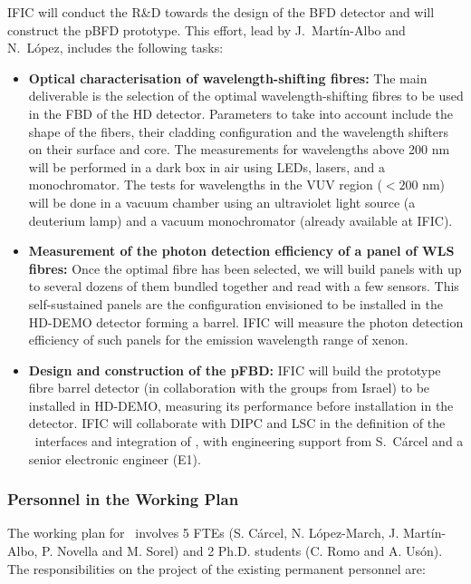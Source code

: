 IFIC will conduct the R\&D towards the design of the BFD detector and will construct the pBFD prototype. This effort, lead by J.~Mart\'in-Albo and N.~L\'opez, includes the following  tasks:
\begin{itemize}
    \item \textbf{Optical characterisation of wavelength-shifting fibres:} The main deliverable is the selection of the optimal wavelength-shifting fibres to be used in the FBD of the HD detector. Parameters to take into account include the shape of the fibers, their cladding configuration and the wavelength shifters on their surface and core. The measurements for wavelengths above 200 nm will be performed in a dark box in air using LEDs, lasers, and  a monochromator. The tests for wavelengths in the VUV region ($<200$ nm) will be done in a vacuum chamber using an ultraviolet light source (a deuterium lamp) and a vacuum monochromator (already available at IFIC).
    \item \textbf{Measurement of the photon detection efficiency of a panel of WLS fibres:} Once the optimal fibre has been selected, we will build panels with up to several dozens of them bundled together and read with a few sensors. This self-sustained panels are the configuration envisioned to be installed in the HD-DEMO detector forming a barrel. IFIC will measure the photon detection efficiency of such panels for the emission wavelength range of xenon. 
    \item \textbf{Design and construction of the pFBD:} IFIC will build the prototype fibre barrel detector (in collaboration with the groups from Israel) to be installed in HD-DEMO, measuring its performance before installation in the detector. IFIC will collaborate with DIPC and LSC in the definition of the \NHD\ interfaces and integration of \NHD, with engineering support from S.~Cárcel and a senior electronic engineer (E1).
\end{itemize}
 

\subsubsection*{Personnel in the Working Plan}
The working plan for \sIFIC\ involves 5 FTEs (S. C\'arcel, N. L\'opez-March, J. Mart\'in-Albo, P. Novella and M. Sorel) and 2 Ph.D. students (C. Romo and A. Us\'on). The responsibilities on the project of the existing permanent personnel are:

